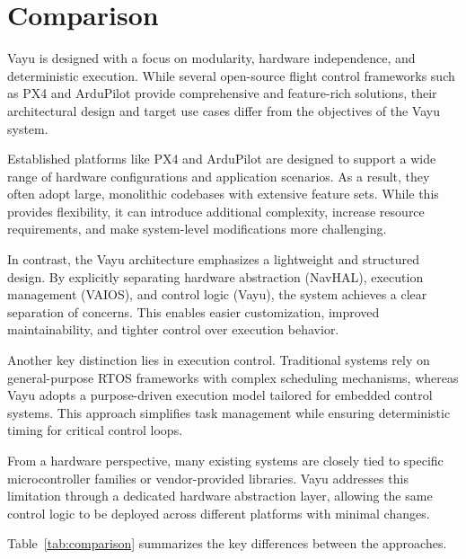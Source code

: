 \section{Comparison}
\label{sec:comparison}

Vayu is designed with a focus on modularity, hardware independence, and deterministic execution. While several open-source flight control frameworks such as PX4 and ArduPilot provide comprehensive and feature-rich solutions, their architectural design and target use cases differ from the objectives of the Vayu system.

Established platforms like PX4 and ArduPilot are designed to support a wide range of hardware configurations and application scenarios. As a result, they often adopt large, monolithic codebases with extensive feature sets. While this provides flexibility, it can introduce additional complexity, increase resource requirements, and make system-level modifications more challenging.

In contrast, the Vayu architecture emphasizes a lightweight and structured design. By explicitly separating hardware abstraction (NavHAL), execution management (VAIOS), and control logic (Vayu), the system achieves a clear separation of concerns. This enables easier customization, improved maintainability, and tighter control over execution behavior.

Another key distinction lies in execution control. Traditional systems rely on general-purpose RTOS frameworks with complex scheduling mechanisms, whereas Vayu adopts a purpose-driven execution model tailored for embedded control systems. This approach simplifies task management while ensuring deterministic timing for critical control loops.

From a hardware perspective, many existing systems are closely tied to specific microcontroller families or vendor-provided libraries. Vayu addresses this limitation through a dedicated hardware abstraction layer, allowing the same control logic to be deployed across different platforms with minimal changes.

Table~\ref{tab:comparison} summarizes the key differences between the approaches.

